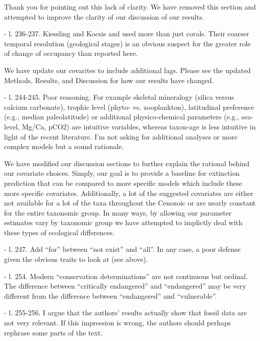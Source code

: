 \documentclass[12pt,letterpaper]{article}
\begin{document}
\begin{refsection}
Thank you for pointing out this lack of clarity. We have removed this section and attempted to improve the clarity of our discussion of our results.

\begin{bfseries}
  - l. 236-237. Kiessling and Kocsis and used more than just corals. Their coarser temporal resolution (geological stages) is an obvious suspect for the greater role of change of occupancy than reported here. 
\end{bfseries}

We have update our covarites to include additional lags. Please see the updated Methods, Results, and Discussion for how our results have changed.

\begin{bfseries}
  - l. 244-245. Poor reasoning. For example skeletal mineralogy (silica versus calcium carbonate), trophic level (phyto- vs. zooplankton), latitudinal preference (e.g., median paleolatitude) or additional physico-chemical parameters (e.g., sea-level, Mg/Ca, pCO2) are intuitive variables, whereas taxon-age is less intuitive in light of the recent literature. I’m not asking for additional analyses or more complex models but a sound rationale.
\end{bfseries}

We have modified our discussion sections to further explain the rational behind our covariate choices. Simply, our goal is to provide a baseline for extinction prediction that can be compared to more specific models which include these more specific covariates. Additionally, a lot of the suggested covariates are either not available for a lot of the taxa throughout the Cenozoic or are nearly constant for the entire taxonomic group. In many ways, by allowing our parameter estimates vary by taxonomic group we have attempted to implictly deal with these types of ecological differences.


\begin{bfseries}
  - l. 247. Add “for” between “not exist” and “all”. In any case, a poor defense given the obvious traits to look at (see above).

  - l. 254. Modern “conservation determinations” are not continuous but ordinal. The difference between “critically endangered” and “endangered” may be very different from the difference between “endangered” and “vulnerable”. 

  - l. 255-256. I argue that the authors’ results actually show that fossil data are not very relevant. If this impression is wrong, the authors should perhaps rephrase some parts of the text.


\end{bfseries}
\end{refsection}
\end{document}
